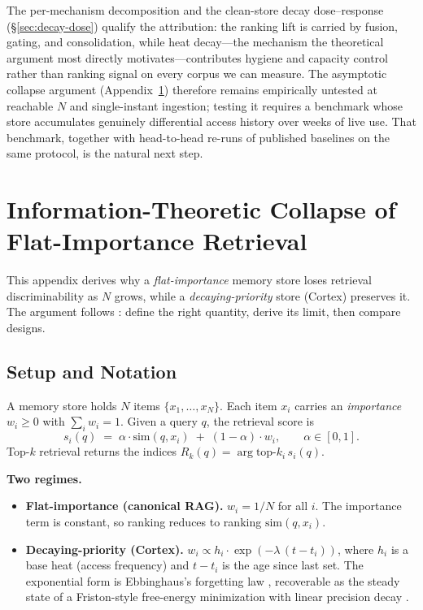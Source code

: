 \documentclass[11pt]{article}
\begin{document}
The per-mechanism decomposition and the clean-store decay
dose--response (\S\ref{sec:decay-dose}) qualify the attribution: the
ranking lift is carried by fusion, gating, and consolidation, while
heat decay---the mechanism the theoretical argument most directly
motivates---contributes hygiene and capacity control rather than
ranking signal on every corpus we can measure.  The asymptotic
collapse argument (Appendix~\ref{app:shannon}) therefore remains
empirically untested at reachable $N$ and single-instant ingestion;
testing it requires a benchmark whose store accumulates genuinely
differential access history over weeks of live use.  That benchmark,
together with head-to-head re-runs of published baselines on the
same protocol, is the natural next step.

\appendix

\section{Information-Theoretic Collapse of Flat-Importance Retrieval}
\label{app:shannon}

This appendix derives why a \emph{flat-importance} memory store
loses retrieval discriminability as $N$ grows, while a
\emph{decaying-priority} store (Cortex) preserves it.  The argument
follows \citet{Shannon1948}: define the right quantity, derive its
limit, then compare designs.

\subsection{Setup and Notation}
\label{app:shannon-setup}

A memory store holds $N$ items $\{x_1, \dots, x_N\}$.  Each item
$x_i$ carries an \emph{importance} $w_i \ge 0$ with $\sum_i w_i = 1$.
Given a query $q$, the retrieval score is
\begin{equation}
s_i(q) \;=\; \alpha \cdot \mathrm{sim}(q, x_i) \;+\;
             (1 - \alpha) \cdot w_i, \qquad \alpha \in [0,1].
\label{eq:score-mix}
\end{equation}
Top-$k$ retrieval returns the indices
$R_k(q) = \arg\text{top-}k_i\, s_i(q)$.

\textbf{Two regimes.}
\begin{itemize}
  \item \textbf{Flat-importance (canonical RAG).}
        $w_i = 1/N$ for all $i$.  The importance term is constant,
        so ranking reduces to ranking $\mathrm{sim}(q, x_i)$.
  \item \textbf{Decaying-priority (Cortex).}
        $w_i \propto h_i \cdot \exp(-\lambda \,(t - t_i))$, where
        $h_i$ is a base heat (access frequency) and $t - t_i$ is
        the age since last set.  The exponential form is
        Ebbinghaus's forgetting law \citep{Ebbinghaus1885},
        recoverable as the steady state of a Friston-style
        free-energy minimization with linear precision decay
        \citep{Friston2010}.
\end{itemize}
\end{document}
